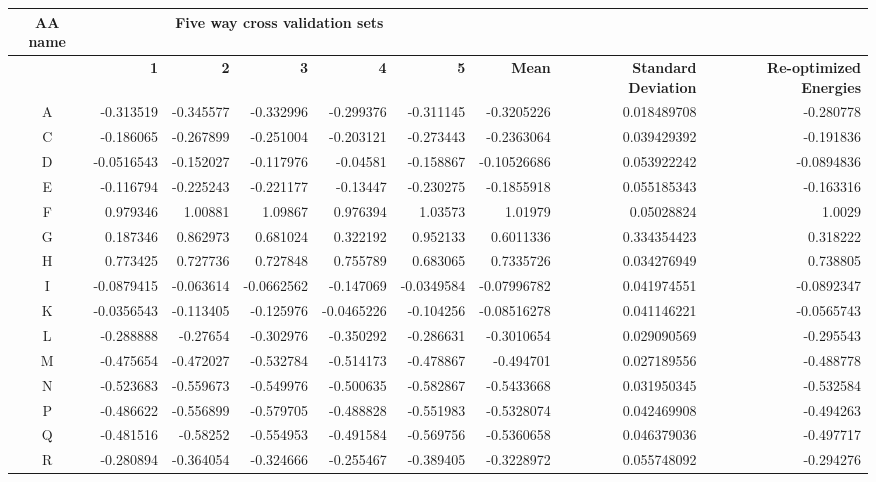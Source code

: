 \begin{tabular}{|c|r|r|r|r|r|r|r|r|}
\hline
 \textbf{AA name} & \multicolumn{5}{c|}{\textbf{Five way cross validation sets}} & & &  \\
\hline
 & \textbf{1} & \textbf{2} & \textbf{3} & \textbf{4} & \textbf{5} & \textbf{Mean} & \textbf{Standard Deviation} & \textbf{Re-optimized Energies} \\
\hline
\hline
A & -0.313519 & -0.345577 & -0.332996 & -0.299376 & -0.311145 & -0.3205226 & 0.018489708 & -0.280778\\
\hline
C & -0.186065 & -0.267899 & -0.251004 & -0.203121 & -0.273443 & -0.2363064 & 0.039429392 & -0.191836\\
\hline
D & -0.0516543 & -0.152027 & -0.117976 & -0.04581 & -0.158867 & -0.10526686 & 0.053922242 & -0.0894836\\
\hline
E & -0.116794 & -0.225243 & -0.221177 & -0.13447 & -0.230275 & -0.1855918 & 0.055185343 & -0.163316\\
\hline
F & 0.979346 & 1.00881 & 1.09867 & 0.976394 & 1.03573 & 1.01979 & 0.05028824 & 1.0029\\
\hline
G & 0.187346 & 0.862973 & 0.681024 & 0.322192 & 0.952133 & 0.6011336 & 0.334354423 & 0.318222\\
\hline
H & 0.773425 & 0.727736 & 0.727848 & 0.755789 & 0.683065 & 0.7335726 & 0.034276949 & 0.738805\\
\hline
I & -0.0879415 & -0.063614 & -0.0662562 & -0.147069 & -0.0349584 & -0.07996782 & 0.041974551 & -0.0892347\\
\hline
K & -0.0356543 & -0.113405 & -0.125976 & -0.0465226 & -0.104256 & -0.08516278 & 0.041146221 & -0.0565743\\
\hline
L & -0.288888 & -0.27654 & -0.302976 & -0.350292 & -0.286631 & -0.3010654 & 0.029090569 & -0.295543\\
\hline
M & -0.475654 & -0.472027 & -0.532784 & -0.514173 & -0.478867 & -0.494701 & 0.027189556 & -0.488778\\
\hline
N & -0.523683 & -0.559673 & -0.549976 & -0.500635 & -0.582867 & -0.5433668 & 0.031950345 & -0.532584\\
\hline
P & -0.486622 & -0.556899 & -0.579705 & -0.488828 & -0.551983 & -0.5328074 & 0.042469908 & -0.494263\\
\hline
Q & -0.481516 & -0.58252 & -0.554953 & -0.491584 & -0.569756 & -0.5360658 & 0.046379036 & -0.497717\\
\hline
R & -0.280894 & -0.364054 & -0.324666 & -0.255467 & -0.389405 & -0.3228972 & 0.055748092 & -0.294276\\

\end{tabular}
